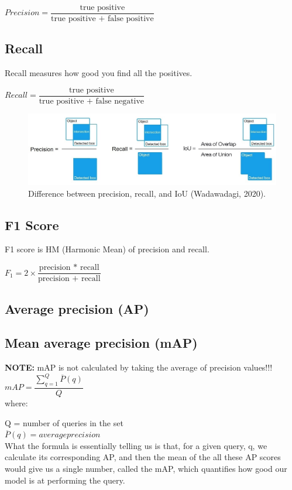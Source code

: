 \documentclass[]{article}
\begin{document}
$Precision = \dfrac{\text{true positive}}{\text{true positive + false positive}}$

\subsection{Recall}

Recall measures how good you find all the positives. 

$Recall = \dfrac{\text{true positive}}{\text{true positive + false negative}}$


\begin{figure}[!h]
	\includegraphics[scale=0.35]{pre_rec_iou}
	\caption{Difference between precision, recall, and IoU (Wadawadagi, 2020).}
	\label{Fig:Race}
\end{figure}

\subsection{F1 Score}

F1 score is HM (Harmonic Mean) of precision and recall.


$F_1 = 2 \times \dfrac  {\text{precision * recall}}{\text{precision + recall}}$
\subsection{Average precision (AP)}


\subsection{Mean average precision (mAP)}
\textbf{NOTE:} mAP is not calculated by taking the average of precision values!!!
\\
$mAP = \dfrac{\sum_{q=1}^Q \overline{P}(q)}{Q}$
\\
where:

Q = number of queries in the set\\
$\overline{P}(q)=average precision$
\\

What the formula is essentially telling us is that, for a given query, q, we calculate its corresponding AP, and then the mean of the all these AP scores would give us a single number, called the mAP, which quantifies how good our model is at performing the query.
\end{document}
